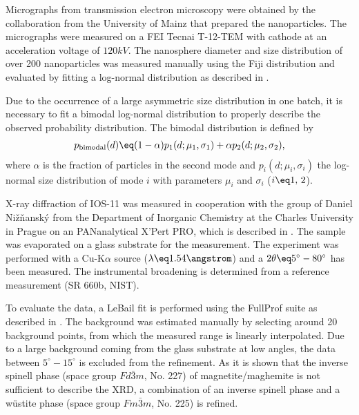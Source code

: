 \documentclass[\main/dresen_thesis.tex]{subfiles}
\begin{document}
  \label{sec:looselyPackedNS:characterization:nanoparticles}
    Micrographs from transmission electron microscopy were obtained by the collaboration from the University of Mainz that prepared the nanoparticles.
    The micrographs were measured on a FEI Tecnai T-12-TEM with  cathode at an acceleration voltage of $120 \unit{kV}$.
    The nanosphere diameter and size distribution of over 200 nanoparticles was measured manually using the Fiji distribution \cite{Schindelin_2012_Fijia} and evaluated by fitting a log-normal distribution as described in .

    Due to the occurrence of a large asymmetric size distribution in one batch, it is necessary to fit a bimodal log-normal distribution to properly describe the observed probability distribution.
    The bimodal distribution is defined by
    \begin{align}
      p_\mathrm{bimodal}(d) \eq (1 - \alpha) p_1(d; \mu_1, \sigma_1) + \alpha p_2(d; \mu_2, \sigma_2),
    \end{align}
    where $\alpha$ is the fraction of particles in the second mode and $p_i(d; \mu_i, \sigma_i)$ the log-normal size distribution of mode $i$ with parameters $\mu_i$ and $\sigma_i$ ($i \eq 1,\,2$).

    X-ray diffraction of IOS-11 was measured in cooperation with the group of Daniel Nižňanský from the Department of Inorganic Chemistry at the Charles University in Prague on an PANanalytical X'Pert PRO, which is described in .
    The sample was evaporated on a glass substrate for the measurement.
    The experiment was performed with a Cu-K$\alpha$ source ($\lambda \eq 1.54 \angstrom$) and a $2 \theta \eq 5^\circ - 80^\circ$ has been measured.
    The instrumental broadening is determined from a  reference measurement (SR 660b, NIST).

    To evaluate the data, a LeBail fit is performed using the FullProf suite \cite{Rodriguez_1993_Recen} as described in .
    The background was estimated manually by selecting around 20 background points, from which the measured range is linearly interpolated.
    Due to a large background coming from the glass substrate at low angles, the data between $5 ^\circ - 15 ^\circ$ is excluded from the refinement.
    As it is shown that the inverse spinell phase (space group $Fd\bar{3}m$, No. 227) of magnetite/maghemite is not sufficient to describe the XRD, a combination of an inverse spinell phase and a w\"ustite phase (space group $Fm\bar{3}m$, No. 225) is refined.
\end{document}
